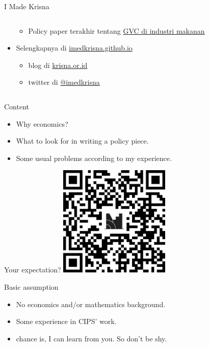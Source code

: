 \documentclass[
  ignorenonframetext,
]{beamer}
\providecommand{\tightlist}{%
  \setlength{\itemsep}{0pt}\setlength{\parskip}{0pt}}\usepackage{longtable,booktabs,array}
\begin{document}
\begin{frame}{I Made Krisna}
\begin{columns}[T]
\begin{column}{0.6\textwidth}
\begin{itemize}
  \begin{itemize}
  \tightlist
  \item
    Policy paper terakhir tentang
    \href{https://www.cips-indonesia.org/publications/perdagangan-untuk-pemulihan-ekonomi\%3A-kebijakan-impor-untuk-mendukung-sektor-makanan-dan-minuman-indonesia}{GVC
    di industri makanan}
  \end{itemize}
\item
  Selengkapnya di
  \href{https://imedkrisna.github.io/}{imedkrisna.github.io}

  \begin{itemize}
  \tightlist
  \item
    blog di \href{https://www.krisna.or.id/}{krisna.or.id}
  \item
    twitter di \href{https://www.twitter.com/imedkrisna}{@imedkrisna}
  \end{itemize}
\end{itemize}
\end{column}
\end{columns}
\end{frame}

\begin{frame}{Content}
\protect\hypertarget{content}{}
\begin{itemize}
\item
  Why economics?
\item
  What to look for in writing a policy piece.
\item
  Some usual problems according to my experience.
\end{itemize}
\end{frame}

\begin{frame}{Your expectation?}
\protect\hypertarget{your-expectation}{}
\includegraphics[width=2.08333in,height=2.08333in]{qr.png}
\end{frame}

\begin{frame}{Basic assumption}
\protect\hypertarget{basic-assumption}{}
\begin{itemize}
\item
  No economics and/or mathematics background.
\item
  Some experience in CIPS' work.
\item
  chance is, I can learn from you. So don't be shy.
\end{itemize}
\end{frame}
\end{document}
